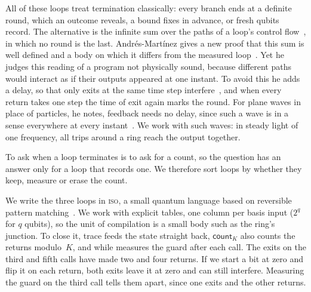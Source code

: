 \documentclass[acmsmall,screen,review,anonymous,nonacm]{acmart}
\newcommand{\storyinlineface}{\small\ttfamily}
\newcommand{\code}[1]{\textnormal{\storyinlineface #1}}
\numberwithin{equation}{section}
\begin{document}
All of these loops treat termination classically: every branch ends at a definite round, which an
outcome reveals, a bound fixes in advance, or fresh qubits record. The alternative is the infinite sum
over the paths of a loop's control flow~\cite{Bartha14QuantumTuringAutomata}, in which no round is
the last. Andr\'es-Mart\'inez gives a new proof that this sum is well defined and a body on which it
differs from the measured loop~\cite[Thm.~3.3.15, \S~3.3.3]{AndresMartinez22Thesis}. Yet he judges
this reading of a program not physically sound, because different paths would interact as if their
outputs appeared at one instant. To avoid this he adds a delay, so that only exits at the same time
step interfere~\cite[Introduction, \S~5.1]{AndresMartinez22Thesis}, and when every return takes one
step the time of exit again marks the round. For plane waves in place of particles, he notes,
feedback needs no delay, since such a wave is in a sense everywhere at every
instant~\cite[\S~5.3]{AndresMartinez22Thesis}. We work with such waves: in
steady light of one frequency, all trips around a ring reach the output together.

To ask when a loop terminates is to ask for a count, so the question has an answer only for a
loop that records one. We therefore sort loops by whether they keep, measure or erase the count.

We write the three loops in \textsc{iso}, a small quantum language based on reversible
pattern matching~\cite{CaretteEtAl24,SabryValironVizzotto18}. We work with explicit tables, one column per basis input ($2^q$ for $q$ qubits), so the unit of compilation is a small body such as the ring's junction. To close it, \code{trace} feeds the state straight back, $\mathsf{count}_K$ also counts
the returns modulo~$K$, and \code{while} measures the guard after each call.
The exits on the third and fifth calls have made two and four returns.
If we start a bit at zero and flip it on each return, both exits leave it at zero and can still
interfere. Measuring the guard on the third call tells them apart,
since one exits and the other returns.
\end{document}
